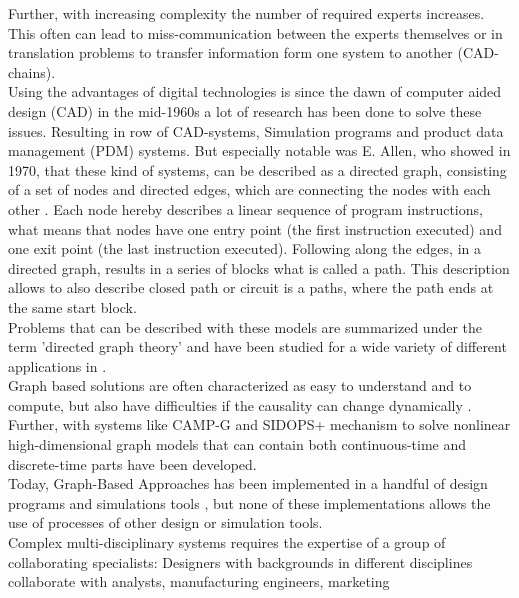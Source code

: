 Further, with increasing complexity the number of required experts increases.
This often can lead to miss-communication between the experts themselves or in translation problems 
to transfer information form one system to another (CAD-chains).\\
Using the advantages of digital technologies is since the dawn of computer aided design (CAD) in the mid-1960s
a lot of research has been done to solve these issues. 
Resulting in row of CAD-systems, Simulation programs and product data management (PDM) systems.
But especially notable was E. Allen, who showed in 1970, that these kind of systems, 
can be described as a directed graph, consisting of a set of nodes and directed edges, 
which are connecting the nodes with each other \cite{allen_control_1970}.
Each node hereby describes a linear sequence of program instructions, 
what means that nodes have one entry point (the first instruction executed) and 
one exit point (the last instruction executed).
Following along the edges, in a directed graph, results in a series of blocks what is called a path.
This description allows to also describe closed path or circuit is a paths, 
where the path ends at the same start block. 
\cite{allen_control_1970}\\
Problems that can be described with these models are summarized 
under the term 'directed graph theory' \cite{bang-jensen_digraphs_2009, lehman_directed_2010}
and have been studied for a wide variety of different applications in 
\cite{lehman_directed_2010, aho_theory_1972, kam_global_1976}.\\
Graph based solutions are often characterized as easy to understand and to compute, 
but also have difficulties if the causality can change dynamically \cite{sinha_modeling_2001}. 
Further, with systems like CAMP-G and SIDOPS+ \cite{breunese_modeling_1996} mechanism to solve 
nonlinear high-dimensional graph models that can contain both continuous-time and 
discrete-time parts have been developed.\\
Today, Graph-Based Approaches has been implemented in a handful of design programs and 
simulations tools \cite{noauthor_dynamo_2020, noauthor_function_2020, noauthor_systems_2020},
but none of these implementations allows the use of processes of other design or simulation tools.\\
Complex multi-disciplinary systems requires the expertise of a group of collaborating specialists:
Designers with backgrounds in different disciplines collaborate with analysts, manufacturing engineers, marketing
